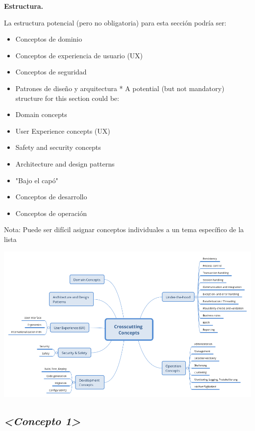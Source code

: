 \documentclass[]{article}
\begin{document}
\textbf{Estructura.}

La estructura potencial (pero no obligatoria) para esta sección podría
ser:

\begin{itemize}
\item
  Conceptos de dominio
\item
  Conceptos de experiencia de usuario (UX)
\item
  Conceptos de seguridad
\item
  Patrones de diseño y arquitectura * A potential (but not mandatory)
  structure for this section could be:
\item
  Domain concepts
\item
  User Experience concepts (UX)
\item
  Safety and security concepts
\item
  Architecture and design patterns
\item
  "Bajo el capó"
\item
  Conceptos de desarrollo
\item
  Conceptos de operación
\end{itemize}

Nota: Puede ser difícil asignar conceptos individuales a un tema
específico de la lista

\includegraphics{images/08-Crosscutting-Concepts-Structure-ES.png}

\hypertarget{__emphasis_concepto_1_emphasis}{%
\subsection{\texorpdfstring{\emph{\textless{}Concepto
1\textgreater{}}}{\textless{}Concepto 1\textgreater{}}}\label{__emphasis_concepto_1_emphasis}}
\end{document}
